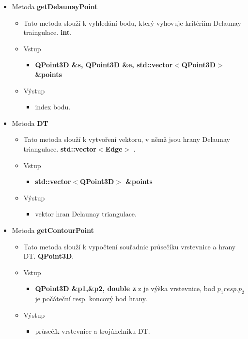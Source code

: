 \documentclass[a4paper, 12pt]{article}
\begin{document}
\begin{itemize}
	\item Metoda \textbf{getDelaunayPoint}		
\begin{itemize}
	\item Tato metoda slouží k vyhledání bodu, který vyhovuje kritériím Delaunay traingulace. \textbf{int}.
	\item Vstup
	\begin{itemize}
		\item \textbf{QPoint3D \&s, QPoint3D \&e, std::vector$<$QPoint3D$>$ \&points} 
	\end{itemize}
	\item Výstup
	\begin{itemize}	
		\item index bodu.
	\end{itemize}
\end{itemize}

	\item Metoda \textbf{DT}		
\begin{itemize}
	\item Tato metoda slouží k vytvoření vektoru, v němž jsou hrany Delaunay triangulace. \textbf{std::vector$<$Edge$>$ }.
	\item Vstup
	\begin{itemize}
		\item \textbf{std::vector$<$QPoint3D$>$ \&points} 
	\end{itemize}
	\item Výstup
	\begin{itemize}	
		\item vektor hran Delaunay triangulace.
	\end{itemize}
\end{itemize}

	\item Metoda \textbf{getContourPoint}		
\begin{itemize}
	\item Tato metoda slouží k vypočtení souřadnic průsečíku vrstevnice a hrany DT. \textbf{QPoint3D}.
	\item Vstup
	\begin{itemize}
		\item \textbf{QPoint3D \&p1,\&p2, double z} z je výška vrstevnice, bod $p_1 resp. p_2$ je počáteční resp. koncový bod hrany.
	\end{itemize}
	\item Výstup
	\begin{itemize}	
		\item průsečík vrstevnice a trojúhelníku DT.
	\end{itemize}
\end{itemize}


\end{itemize}
\end{document}
